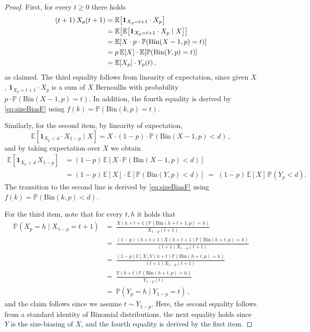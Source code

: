 \documentclass[10pt,a4paper]{amsart}
\numberwithin{equation}{section}
\newcommand{\E}{\mathbb E}
\renewcommand{\P}{\mathbb P}
\newcommand{\Bin}{\mathrm{Bin}}
\begin{document}
\begin{proof}
First, for every $t \ge 0$ there holds 
\begin{align}
\label{eq:yp_sizebias_of_xp}
(t+1)\,X_p(t+1)
&= \E\!\left[\mathbf 1_{X_p=t+1}\cdot X_p\right] \notag\\
&= \E\!\left[\E\!\left[\mathbf 1_{X_p=t+1}\cdot X_p \mid X\right]\right] \notag\\
&= \E\!\left[X\cdot p \cdot \P(\Bin(X-1,p)=t )\right] \notag\\
&= p\,\E[X]\cdot \E[\P(\Bin(Y,p)=t)] \notag\\
&= \E[X_p]\cdot Y_p(t)\,, \notag
\end{align}
as claimed. The third equality follows from linearity of expectation, since given $X$, $\mathbf 1_{X_p=t+1}\cdot X_p$ is a sum of $X$ Bernoullis with probability $p\cdot\P(\Bin(X-1,p)=t).$ In addition, the fourth equality is derived by \eqref{eq:sizeBiasF} using $f(k)=\P(\Bin(k,p)=t).$


Similarly, for the second item, by linearity of expectation,
\[
\E[\mathbf 1_{X_p<d}\cdot X_{1-p}\mid X] = X\cdot (1-p)\cdot\P(\Bin(X-1,p)<d)\,,
\]
and by taking expectation over $X$ we obtain
\begin{align*}
\E\!\left[\mathbf 1_{X_p<d}\,X_{1-p}\right]
&=(1-p)\,\E\!\left[X\cdot\P\!\left(\Bin(X-1,p)<d \right)\right] \\
&=(1-p)\,\E[X]\cdot\E[\P\!\left(\Bin(Y,p)<d\right)]
\;=\;(1-p)\,\E[X]\,\P\!\left(Y_p<d\right).
\end{align*}
The transition to the second line is derived by \eqref{eq:sizeBiasF} using $f(k)=\P(\Bin(k,p)<d)$.

For the third item, note that for every $t,h$ it holds that
\begin{align*}
\P(X_p=h\mid X_{1-p}=t+1) &=~ \frac{X(h+t+1)\P(\Bin(h+t+1,p)=h)}{X_{1-p}(t+1)}\\[0.6em]
&=~ \frac{(1-p)(h+t+1)X(h+t+1)\P(\Bin(h+t,p)=h)}{(t+1)X_{1-p}(t+1)} \\[0.6em]
&=~ \frac{(1-p)\E[X]Y(h+t)\P(\Bin(h+t,p)=h)}{(t+1)X_{1-p}(t+1)} \\[0.6em]
&=~ \frac{Y(h+t)\P(\Bin(h+t,p)=h)}{Y_{1-p}(t)} \\
&=~ \P(Y_p=h\mid Y_{1-p}=t) \,,
\end{align*}
and the claim follows since we assume $t\sim Y_{1-p}$. Here, the second equality follows from a standard identity of Binomial distributions, the next equality holds since $Y$ is the size-biasing of $X$, and the fourth equality is derived by the first item.
\end{proof}
\end{document}
